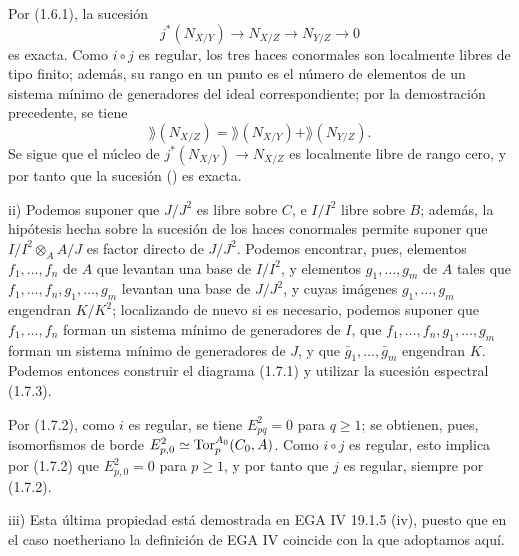 Por (1.6.1), la sucesión
\[
 j^*(N_{X/Y})\longrightarrow N_{X/Z}\longrightarrow N_{Y/Z}\longrightarrow0
\]
es exacta. Como $i\circ j$ es regular, los tres haces conormales son localmente libres de tipo finito; además, su rango en un punto es el número de elementos de un sistema mínimo de generadores del ideal correspondiente; por la demostración precedente, se tiene
\[
 \rang(N_{X/Z})=\rang(N_{X/Y})+\rang(N_{Y/Z}).
\]
Se sigue que el núcleo de $j^*(N_{X/Y})\longrightarrow N_{X/Z}$ es localmente libre de rango cero, y por tanto que la sucesión () es exacta.

ii) Podemos suponer que $J/J^2$ es libre sobre $C$, e $I/I^2$ libre sobre $B$; además, la hipótesis hecha sobre la sucesión de los haces conormales permite suponer que $I/I^2\otimes_A A/J$ es factor directo de $J/J^2$. Podemos encontrar, pues, elementos $f_1,\ldots,f_n$ de $A$ que levantan una base de $I/I^2$, y elementos $g_1,\ldots,g_m$ de $A$ tales que $f_1,\ldots,f_n,g_1,\ldots,g_m$ levantan una base de $J/J^2$, y cuyas imágenes $g_1,\ldots,g_m$ engendran $K/K^2$; localizando de nuevo si es necesario, podemos suponer que $f_1,\ldots,f_n$ forman un sistema mínimo de generadores de $I$, que $f_1,\ldots,f_n,g_1,\ldots,g_m$ forman un sistema mínimo de generadores de $J$, y que $\bar g_1,\ldots,\bar g_m$ engendran $K$. Podemos entonces construir el diagrama (1.7.1) y utilizar la sucesión espectral (1.7.3).

Por (1.7.2), como $i$ es regular, se tiene $E^2_{pq}=0$ para $q\geq1$; se obtienen, pues, isomorfismos de borde $E^2_{p,0}\simeq\operatorname{Tor}_p^{A_0}(C_0,A)$. Como $i\circ j$ es regular, esto implica por (1.7.2) que $E^2_{p,0}=0$ para $p\geq1$, y por tanto que $j$ es regular, siempre por (1.7.2).

iii) Esta última propiedad está demostrada en EGA IV 19.1.5 (iv), puesto que en el caso noetheriano la definición de EGA IV coincide con la que adoptamos aquí.

